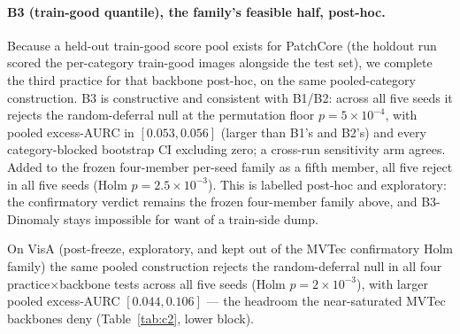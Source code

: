 \documentclass[11pt]{article}
\begin{document}
\paragraph{B3 (train-good quantile), the family's feasible half, post-hoc.} Because a held-out
train-good score pool exists for PatchCore (the holdout run scored the per-category
train-good images alongside the test set), we complete the third practice for that backbone
post-hoc, on the same pooled-category construction. B3 is constructive and consistent with B1/B2:
across all five seeds it rejects the random-deferral null at the permutation floor
$p=5\times10^{-4}$, with pooled excess-AURC in $[0.053,0.056]$ (larger than B1's and B2's) and every
category-blocked bootstrap CI excluding zero; a cross-run sensitivity arm agrees. Added to the
frozen four-member per-seed family as a fifth member, all five reject in all five seeds
(Holm $p=2.5\times10^{-3}$). This is labelled post-hoc and exploratory: the confirmatory verdict
remains the frozen four-member family above, and B3-Dinomaly stays impossible for want of a
train-side dump.

On VisA (post-freeze, exploratory, and kept out of the MVTec confirmatory Holm family) the same
pooled construction rejects the random-deferral null in all four practice$\times$backbone tests
across all five seeds (Holm $p=2\times10^{-3}$), with larger pooled excess-AURC $[0.044,0.106]$ ---
the headroom the near-saturated MVTec backbones deny (Table~\ref{tab:c2}, lower block).
\end{document}
